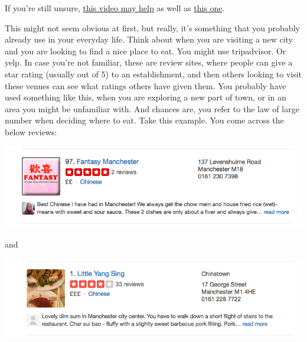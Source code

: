 \documentclass[]{book}
\theoremstyle{definition}
\theoremstyle{definition}
\theoremstyle{definition}
\theoremstyle{remark}
\begin{document}
If you're still unsure,
\href{https://www.youtube.com/watch?v=agBcvkyi6sg}{this video may help}
as well as \href{https://www.youtube.com/watch?v=iN-77YVqLDw}{this one}.

This might not seem obvious at first, but really, it's something that
you probably already use in your everyday life. Think about when you are
visiting a new city and you are looking to find a nice place to eat. You
might use tripadvisor. Or yelp. In case you're not familiar, these are
review sites, where people can give a star rating (usually out of 5) to
an establishment, and then others looking to visit these venues can see
what ratings others have given them. You probably have used something
like this, when you are exploring a new part of town, or in an area you
might be unfamiliar with. And chances are, you refer to the law of large
number when deciding where to eat. Take this example. You come across
the below reviews:

\includegraphics{imgs/review_1.png}

and

\includegraphics{imgs/review_2.png}
\end{document}
